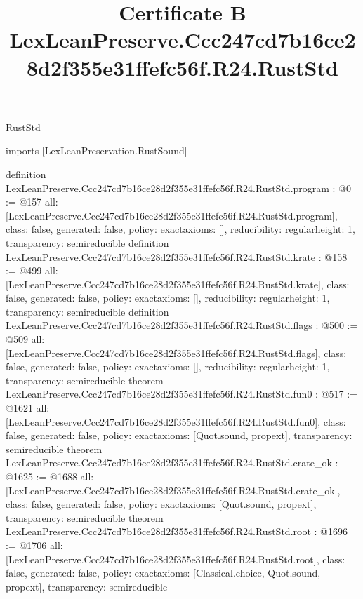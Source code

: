 \begin{lexlean}{RustStd}
\title{Certificate B LexLeanPreserve.Ccc247cd7b16ce28d2f355e31ffefc56f.R24.RustStd}
\begin{coremodule}
imports [LexLeanPreservation.RustSound]

definition LexLeanPreserve.Ccc247cd7b16ce28d2f355e31ffefc56f.R24.RustStd.program : @0 := @157 {
  all: [LexLeanPreserve.Ccc247cd7b16ce28d2f355e31ffefc56f.R24.RustStd.program],
  class: false,
  generated: false,
  policy: exact{axioms: []},
  reducibility: regular{height: 1},
  transparency: semireducible
}
definition LexLeanPreserve.Ccc247cd7b16ce28d2f355e31ffefc56f.R24.RustStd.krate : @158 := @499 {
  all: [LexLeanPreserve.Ccc247cd7b16ce28d2f355e31ffefc56f.R24.RustStd.krate],
  class: false,
  generated: false,
  policy: exact{axioms: []},
  reducibility: regular{height: 1},
  transparency: semireducible
}
definition LexLeanPreserve.Ccc247cd7b16ce28d2f355e31ffefc56f.R24.RustStd.flags : @500 := @509 {
  all: [LexLeanPreserve.Ccc247cd7b16ce28d2f355e31ffefc56f.R24.RustStd.flags],
  class: false,
  generated: false,
  policy: exact{axioms: []},
  reducibility: regular{height: 1},
  transparency: semireducible
}
theorem LexLeanPreserve.Ccc247cd7b16ce28d2f355e31ffefc56f.R24.RustStd.fun0 : @517 := @1621 {
  all: [LexLeanPreserve.Ccc247cd7b16ce28d2f355e31ffefc56f.R24.RustStd.fun0],
  class: false,
  generated: false,
  policy: exact{axioms: [Quot.sound, propext]},
  transparency: semireducible
}
theorem LexLeanPreserve.Ccc247cd7b16ce28d2f355e31ffefc56f.R24.RustStd.crate_ok : @1625 := @1688 {
  all: [LexLeanPreserve.Ccc247cd7b16ce28d2f355e31ffefc56f.R24.RustStd.crate_ok],
  class: false,
  generated: false,
  policy: exact{axioms: [Quot.sound, propext]},
  transparency: semireducible
}
theorem LexLeanPreserve.Ccc247cd7b16ce28d2f355e31ffefc56f.R24.RustStd.root : @1696 := @1706 {
  all: [LexLeanPreserve.Ccc247cd7b16ce28d2f355e31ffefc56f.R24.RustStd.root],
  class: false,
  generated: false,
  policy: exact{axioms: [Classical.choice, Quot.sound, propext]},
  transparency: semireducible
}


\end{coremodule}
\end{lexlean}
